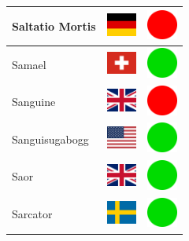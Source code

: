 \documentclass[12pt, a4paper, twoside]{report}
\begin{document}
\begin{center}
\begin{longtable}{|p{5cm}|p{2cm}|p{2cm}|}
 Saltatio Mortis                                            & \includegraphics[width=1cm]{../img/flags/de} &   \includegraphics[width=1cm]{../likes/n} \\ \hline
 Samael                                                     & \includegraphics[width=1cm]{../img/flags/ch} &   \includegraphics[width=1cm]{../likes/y} \\ \hline
 Sanguine                                                   & \includegraphics[width=1cm]{../img/flags/gb} &   \includegraphics[width=1cm]{../likes/n} \\ \hline
 Sanguisugabogg                                             & \includegraphics[width=1cm]{../img/flags/us} &   \includegraphics[width=1cm]{../likes/y} \\ \hline
 Saor                                                       & \includegraphics[width=1cm]{../img/flags/gb} &   \includegraphics[width=1cm]{../likes/y} \\ \hline
 Sarcator                                                   & \includegraphics[width=1cm]{../img/flags/se} &   \includegraphics[width=1cm]{../likes/y} \\ \hline

\end{longtable}
\end{center}
\end{document}
